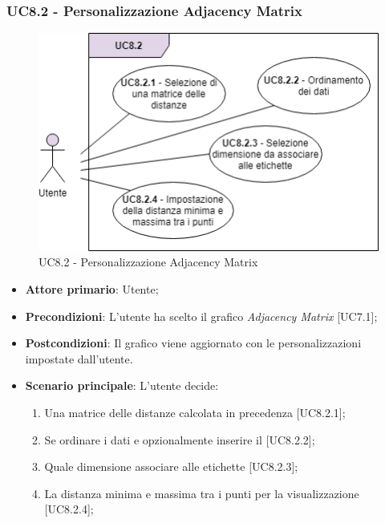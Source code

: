 \subsubsection{UC8.2 - Personalizzazione Adjacency Matrix}
\begin{figure}[h]
\includegraphics[width=13cm]{Section/Images/UC8.2.png}
\centering
\caption{UC8.2 - Personalizzazione Adjacency Matrix}
\end{figure}
\begin{itemize}
	\item \textbf{Attore primario}: Utente;
	
	\item \textbf{Precondizioni}: L'utente ha scelto il grafico \textit{Adjacency Matrix} [UC7.1];
	
	\item \textbf{Postcondizioni}: Il grafico viene aggiornato con le personalizzazioni impostate dall'utente.
	
	\item \textbf{Scenario principale}: L'utente decide:
	
\begin{enumerate}
\item Una matrice delle distanze calcolata in precedenza [UC8.2.1];
\item Se ordinare i dati e opzionalmente inserire il  [UC8.2.2];
\item Quale dimensione associare alle etichette [UC8.2.3];
\item La distanza minima e massima tra i punti per la visualizzazione [UC8.2.4];
\end{enumerate}	
		
\end{itemize}
